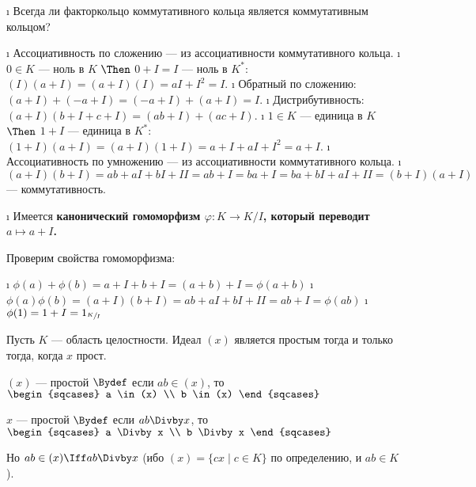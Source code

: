 \begin{problem}[19(4.2)]
\end{problem}

\begin{enumerate}
\def\labelenumi{\alph{enumi})}
\tightlist
\i
  Всегда ли факторкольцо коммутативного кольца является коммутативным кольцом?
  \begin{solution}

  \begin{itemize}
  \tightlist
  \i
    Ассоциативность по сложению --- из ассоциативности коммутативного кольца.
  \i
    \(0 \in K\) --- ноль в \(K\) \(\Then\) \(0+I=I\) --- ноль в \(K^*\): \((I)(a+I) = (a+I)(I) = aI+I^2 = I\).
  \i
    Обратный по сложению: \((a+I)+(-a+I) = (-a+I)+(a+I) = I\).
  \i
    Дистрибутивность: \((a+I)(b+I+c+I) = (ab+I)+(ac+I)\).
  \i
    \(1 \in K\) --- единица в \(K\) \(\Then\) \(1+I\) --- единица в \(K^*\): \((1+I)(a+I) = (a+I)(1+I) = a+I+aI+I^2 = a+I\).
  \i
    Ассоциативность по умножению --- из ассоциативности коммутативного кольца.
  \i
    \((a+I)(b+I) = ab+aI+bI+II=ab+I=ba+I=ba+bI+aI+II=(b+I)(a+I)\) --- коммутативность.
  \end{itemize}

  \end{solution}
\i
  Имеется \bf{канонический} гомоморфизм \(\varphi: K \to K/I\), который переводит \(a \mapsto a+I\).
  \begin{solution}
  Проверим свойства гомоморфизма:

  \begin{itemize}
  \tightlist
  \i
    \(\phi(a)+\phi(b)=a+I+b+I= (a+b)+I=\phi(a+b)\)
  \i
    \(\phi(a)\phi(b) = (a+I)(b+I) = ab+aI+bI+II = ab+I = \phi(ab)\)
  \i
    \(\phi(1) = 1+I = 1_{\sfrac{K}{I}}\)
  \end{itemize}

  \end{solution}
\end{enumerate}

\begin{problem}[20(4.5)]
Пусть $K$ --- область целостности. Идеал $(x)$ является простым тогда и только тогда, когда $x$ прост.
\end{problem}

\begin{solution}
\((x)\) --- простой \(\Bydef\) если \(ab \in (x)\), то \(\begin{sqcases} a \in (x) \\ b \in (x) \end{sqcases}\)

\(x\) --- простой \(\Bydef\) если \(ab \Divby x\), то \(\begin{sqcases} a \Divby x \\ b \Divby x \end{sqcases}\)

Но \(ab \in (x) \Iff ab \Divby x\) (ибо \((x) = \{cx \mid c \in K\}\) по определению, и \(ab \in K\)).
\end{solution}

